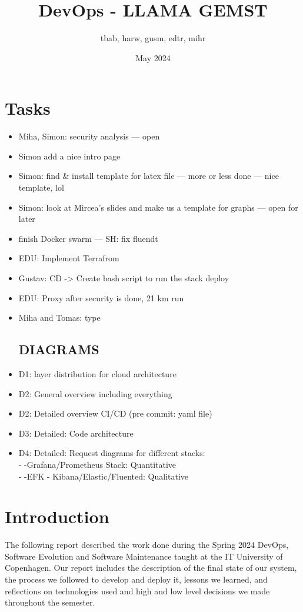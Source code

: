 \documentclass{article}
\title{DevOps - LLAMA GEMST}
\author{tbab, harw, gusm, edtr, mihr}
\date{May 2024}
\begin{document}
\maketitle

\section{Tasks}

\begin{itemize}
  \item Miha, Simon: security analysis — open
  \item Simon add a nice intro page
  \item Simon: find \& install template for latex file — more or less done — nice template, lol
  \item Simon: look at Mircea's slides and make us a template for graphs — open for later
  \item finish Docker swarm — SH: fix fluendt 
    \item EDU: Implement Terrafrom
    \item Gustav: CD -> Create bash script to run the stack deploy
    \item EDU: Proxy after security is done, 21 km run
   \item Miha and Tomas: type

\subsection{DIAGRAMS}
 
    \item D1: layer distribution for cloud architecture 
    \item D2: General overview including everything 
    \item D2: Detailed overview CI/CD (pre commit: yaml file)
    \item D3: Detailed: Code architecture 
    \item D4: Detailed: Request diagrams for different stacks:
        \\ - -Grafana/Prometheus Stack: Quantitative 
        \\ - -EFK - Kibana/Elastic/Fluented: Qualitative

 \end{itemize}
\section{Introduction}
The following report described the work done during the Spring 2024 DevOps, Software Evolution and Software Maintenance taught at the IT University of Copenhagen. Our report includes the description of the final state of our system, the process we followed to develop and deploy it, lessons we learned, and reflections on technologies used and high and low level decisions we made throughout the semester.
\end{document}

